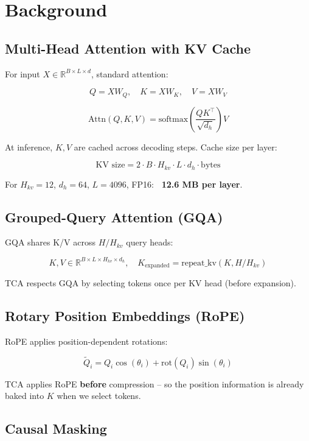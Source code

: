 \section{Background}

\subsection{Multi-Head Attention with KV Cache}

For input $X \in \mathbb{R}^{B \times L \times d}$, standard attention:

\[
Q = X W_Q, \quad K = X W_K, \quad V = X W_V
\tag{3.1}
\]

\[
\text{Attn}(Q, K, V) = \text{softmax}\!\left(\frac{Q K^\top}{\sqrt{d_h}}\right) V
\tag{3.2}
\]

At inference, $K, V$ are cached across decoding steps. Cache size per layer:

\[
\text{KV size} = 2 \cdot B \cdot H_{kv} \cdot L \cdot d_h \cdot \text{bytes}
\tag{3.3}
\]

For $H_{kv} = 12$, $d_h = 64$, $L = 4096$, FP16: \textbf{~12.6 MB per layer}.

\subsection{Grouped-Query Attention (GQA)}

GQA shares K/V across $H/H_{kv}$ query heads:

\[
K, V \in \mathbb{R}^{B \times L \times H_{kv} \times d_h}, \quad
K_{\text{expanded}} = \text{repeat\_kv}(K, H/H_{kv})
\tag{3.4}
\]

TCA respects GQA by selecting tokens once per KV head (before expansion).

\subsection{Rotary Position Embeddings (RoPE)}

RoPE applies position-dependent rotations:

\[
\tilde{Q}_i = Q_i \cos(\theta_i) + \text{rot}(Q_i) \sin(\theta_i)
\tag{3.5}
\]

TCA applies RoPE \textbf{before} compression -- so the position information is 
already baked into $K$ when we select tokens.

\subsection{Causal Masking}

